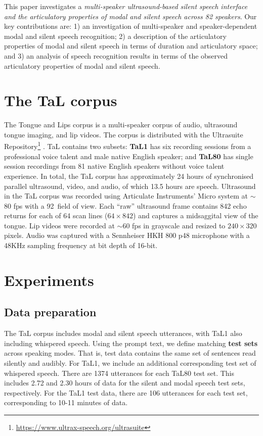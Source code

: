 \documentclass[a4paper]{article}
\begin{document}
This paper investigates a \emph{multi-speaker ultrasound-based silent speech interface and the articulatory properties of modal and silent speech across 82 speakers}.
Our key contributions are:
1) an investigation of multi-speaker and speaker-dependent modal and silent speech recognition;
2) a description of the articulatory properties of modal and silent speech in terms of duration and articulatory space; and
3) an analysis of speech recognition results in terms of the observed articulatory properties of modal and silent speech.

\section{The TaL corpus}
\label{sec:data}
The Tongue and Lips corpus \cite{ribeiro2021tal} is a multi-speaker corpus of audio, ultrasound tongue imaging, and lip videos.
The corpus is distributed with the Ultrasuite Repository\footnote{\label{fn:ultrasuite}\url{https://www.ultrax-speech.org/ultrasuite}} \cite{eshky2018ultrasuite}.
TaL contains two subsets:
\textbf{TaL1} has six recording sessions from a professional voice talent and male native English speaker; and
\textbf{TaL80} has single session recordings from 81 native English speakers without voice talent experience.
In total, the TaL corpus has approximately 24 hours of synchronised parallel ultrasound, video, and audio, of which  13.5 hours are speech.
Ultrasound in the TaL corpus was recorded using Articulate Instruments' Micro system \cite{articulate2010articulate} at $\sim$80 fps with a 92\degree ~field of view.
Each \enquote{raw} ultrasound frame contains 842 echo returns for each of 64 scan lines ($64\times842$) and captures a midsaggital view of the tongue.
Lip videos were recorded at $\sim$60 fps in grayscale and resized to $240\times320$ pixels.
Audio was captured with a Sennheiser HKH 800 p48 microphone with a 48KHz sampling frequency at bit depth of 16-bit.


\section{Experiments}
\label{sec:experiments}

\subsection{Data preparation}

The TaL corpus includes modal and silent speech utterances, with TaL1 also including whispered speech.
Using the prompt text, we define matching \textbf{test sets} across speaking modes.
That is, test data contains the same set of sentences read silently and audibly.
For TaL1, we include an additional corresponding test set of whispered speech.
There are 1374 utterances for each TaL80 test set.
This includes 2.72 and 2.30 hours of data for the silent and modal speech test sets, respectively.
For the TaL1 test data, there are 106 utterances for each test set, corresponding to 10-11 minutes of data.
\end{document}
